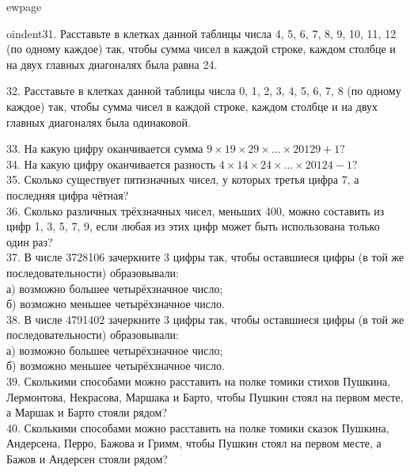 ewpage

oindent31. Расставьте в клетках данной таблицы числа 4, 5, 6, 7, 8, 9, 10, 11, 12 (по одному каждое) так, чтобы сумма чисел в каждой строке, каждом столбце и на двух главных диагоналях была равна 24.
\begin{center}
\begin{figure}[ht!]
\end{figure}
\end{center}
32. Расставьте в клетках данной таблицы числа 0, 1, 2, 3, 4, 5, 6, 7, 8 (по одному каждое) так, чтобы сумма чисел в каждой строке, каждом столбце и на двух главных диагоналях была одинаковой.
\begin{center}
\begin{figure}[ht!]
\end{figure}
\end{center}
33. На какую цифру оканчивается сумма $9\times19\times29\times\ldots\times20129+1?$\\
34. На какую цифру оканчивается разность $4\times14\times24\times\ldots\times20124-1?$\\
35. Сколько существует пятизначных чисел, у которых третья цифра 7, а последняя цифра чётная?\\
36. Сколько различных трёхзначных чисел, меньших 400, можно составить из цифр 1, 3, 5, 7, 9, если любая из этих цифр может быть использована только один раз?\\
37. В числе 3728106 зачеркните 3 цифры так, чтобы оставшиеся цифры (в той же последовательности) образовывали:\\
а) возможно большее четырёхзначное число;\\
б) возможно меньшее четырёхзначное число.\\
38. В числе 4791402 зачеркните 3 цифры так, чтобы оставшиеся цифры (в той же последовательности) образовывали:\\
а) возможно большее четырёхзначное число;\\
б) возможно меньшее четырёхзначное число.\\
39. Сколькими способами можно расставить на полке томики стихов Пушкина, Лермонтова, Некрасова, Маршака и Барто, чтобы Пушкин стоял на первом месте, а Маршак и Барто стояли рядом?\\
40. Сколькими способами можно расставить на полке томики сказок Пушкина, Андерсена, Перро, Бажова и Гримм, чтобы Пушкин стоял на первом месте, а Бажов и Андерсен стояли рядом?\\
